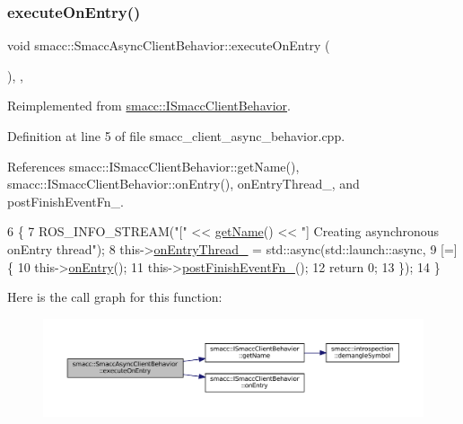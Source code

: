 \subsubsection{\texorpdfstring{execute\+On\+Entry()}{executeOnEntry()}}
{\footnotesize\ttfamily void smacc\+::\+Smacc\+Async\+Client\+Behavior\+::execute\+On\+Entry (\begin{DoxyParamCaption}{ }\end{DoxyParamCaption})\hspace{0.3cm}{\ttfamily [override]}, {\ttfamily [protected]}, {\ttfamily [virtual]}}



Reimplemented from \hyperlink{classsmacc_1_1ISmaccClientBehavior_a90b7032f7520f9e7e805835e6ed9d43e}{smacc\+::\+I\+Smacc\+Client\+Behavior}.



Definition at line 5 of file smacc\+\_\+client\+\_\+async\+\_\+behavior.\+cpp.



References smacc\+::\+I\+Smacc\+Client\+Behavior\+::get\+Name(), smacc\+::\+I\+Smacc\+Client\+Behavior\+::on\+Entry(), on\+Entry\+Thread\+\_\+, and post\+Finish\+Event\+Fn\+\_\+.


\begin{DoxyCode}
6     \{
7         ROS\_INFO\_STREAM(\textcolor{stringliteral}{"["} << \hyperlink{classsmacc_1_1ISmaccClientBehavior_a18e4bec9460b010f2894c0f7e7064a34}{getName}() << \textcolor{stringliteral}{"] Creating asynchronous onEntry thread"});
8         this->\hyperlink{classsmacc_1_1SmaccAsyncClientBehavior_a6346e036a68f41c4397d7336f8519645}{onEntryThread\_} = std::async(std::launch::async,
9             [=] \{
10                 this->\hyperlink{classsmacc_1_1ISmaccClientBehavior_a3ec24a839087c550e1d62a81e48cf530}{onEntry}();
11                 this->\hyperlink{classsmacc_1_1SmaccAsyncClientBehavior_af7a9ee952ba3fb8629aa55491606a7b2}{postFinishEventFn\_}();
12                 \textcolor{keywordflow}{return} 0;
13                 \});
14     \}
\end{DoxyCode}
Here is the call graph for this function\+:
\nopagebreak
\begin{figure}[H]
\begin{center}
\leavevmode
\includegraphics[width=350pt]{classsmacc_1_1SmaccAsyncClientBehavior_ab8ca63d40d61554263466fe4c0b5cbd1_cgraph}
\end{center}
\end{figure}
\mbox{\label{classsmacc_1_1SmaccAsyncClientBehavior_a3d982d370df4f133ad37c0b2370e9b82}} 
